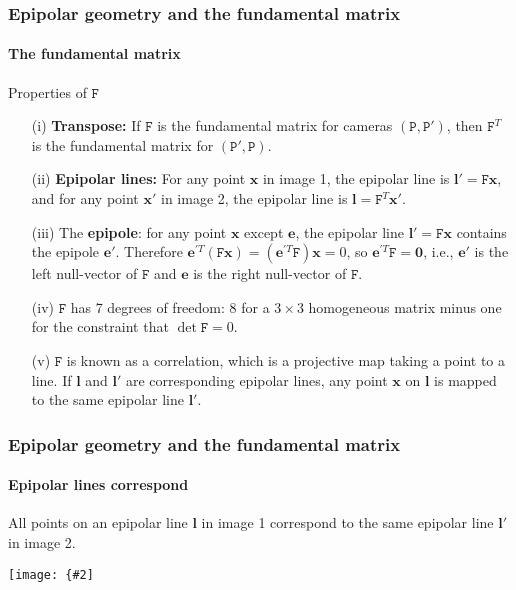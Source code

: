 \documentclass[aspectratio=169]{beamer}
\renewcommand{\vec}[1]{\boldsymbol{#1}}
\newcommand{\mat}[1]{\mathtt{#1}}
\newcommand{\myfig}[3]{\centerline{\texttt{[image: \{\#2]}}}
    \centerline{\scriptsize #3}}
\begin{document}
\begin{frame}
\frametitle{Epipolar geometry and the fundamental matrix}
\framesubtitle{The fundamental matrix}

\begin{block}{Properties of $\mat{F}$}
\begin{itemize}
\item[(i)] {\bf Transpose:} If $\mat{F}$ is the fundamental matrix for
  cameras $(\mat{P},\mat{P}')$, then $\mat{F}^T$ is the fundamental
  matrix for $(\mat{P}',\mat{P})$.
\item[(ii)] {\bf Epipolar lines:} For any point $\vec{x}$ in image 1,
  the epipolar line is $\vec{l}'=\mat{F}\vec{x}$, and for any point
  $\vec{x}'$ in image 2, the epipolar line is
  $\vec{l}=\mat{F}^T\vec{x}'$.
\item[(iii)] The {\bf epipole}: for any point $\vec{x}$ except
  $\vec{e}$, the epipolar line $\vec{l}'=\mat{F}\vec{x}$ contains the
  epipole $\vec{e}'$.  Therefore $\vec{e}^{\prime
  T}(\mat{F}\vec{x})=(\vec{e}^{\prime T}\mat{F})\vec{x}=0$, so
  $\vec{e}^{\prime T}\mat{F}=\vec{0}$, i.e., $\vec{e}'$ is the left
  null-vector of $\mat{F}$ and $\vec{e}$ is the right null-vector of
  $\mat{F}$.
\item[(iv)] $\mat{F}$ has 7 degrees of freedom: 8 for a $3\times 3$
  homogeneous matrix minus one for the constraint that
  $\det\mat{F}=0$.
\item[(v)] $\mat{F}$ is known as a \alert{correlation}, which is a
  projective map taking a point to a line.  If $\vec{l}$ and
  $\vec{l}'$ are corresponding epipolar lines, any point $\vec{x}$ on
  $\vec{l}$ is mapped to the same epipolar line $\vec{l}'$.
\end{itemize}
\end{block}

\end{frame}

\begin{frame}
\frametitle{Epipolar geometry and the fundamental matrix}
\framesubtitle{Epipolar lines correspond}

All points on an epipolar line $\vec{l}$ in image 1 correspond to the
same epipolar line $\vec{l}'$ in image 2.

\medskip

\myfig{1.9in}{HZ-fig8-6a}{Hartley and Zisserman (2004), Fig.\ 9.6a}

\end{frame}
\end{document}
